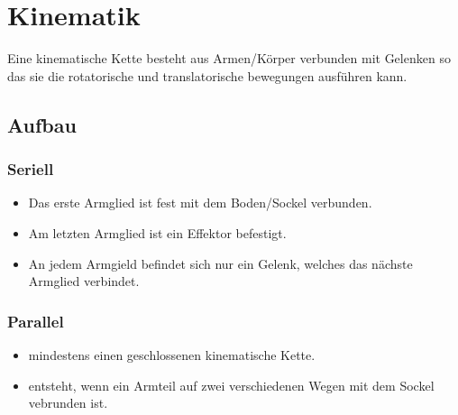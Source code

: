 \clearpage
\section{Kinematik}
Eine kinematische Kette besteht aus Armen/Körper verbunden mit Gelenken so das sie die rotatorische und translatorische bewegungen ausführen kann.
\subsection{Aufbau}
\begin{minipage}{0.5\linewidth}
\subsubsection{Seriell}
\begin{itemize}
    \item Das erste Armglied ist fest mit dem Boden/Sockel verbunden.
    \item Am letzten Armglied ist ein Effektor befestigt.
    \item An jedem Armgield befindet sich nur ein Gelenk, welches das nächste Armglied verbindet.  
\end{itemize}
\end{minipage}
\begin{minipage}{0.5\linewidth}
\subsubsection{Parallel}
\begin{itemize}
    \item mindestens einen geschlossenen kinematische Kette.
    \item entsteht, wenn ein Armteil auf zwei verschiedenen Wegen mit dem Sockel vebrunden ist.
\end{itemize}
\end{minipage}
